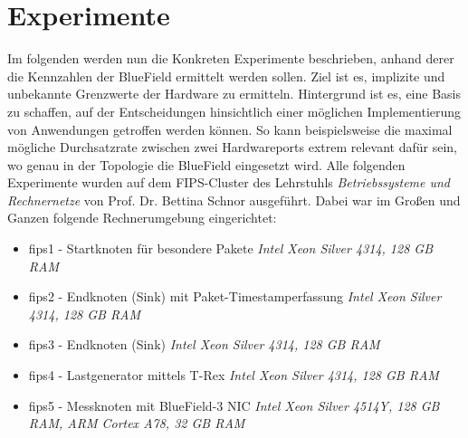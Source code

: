 \documentclass[paper=a4, fontsize=11pt]{scrartcl} %
\numberwithin{equation}{section} %
\numberwithin{figure}{section} %
\numberwithin{table}{section} %
\begin{document}
\section{Experimente}
Im folgenden werden nun die Konkreten Experimente beschrieben, anhand derer die Kennzahlen der BlueField ermittelt werden sollen. Ziel ist es, implizite und unbekannte Grenzwerte der Hardware zu ermitteln. Hintergrund ist es, eine Basis zu schaffen, auf der Entscheidungen hinsichtlich einer möglichen Implementierung von Anwendungen getroffen werden können. So kann beispielsweise die maximal mögliche Durchsatzrate zwischen zwei Hardwareports extrem relevant dafür sein, wo genau in der Topologie die BlueField eingesetzt wird. Alle folgenden Experimente wurden auf dem FIPS-Cluster des Lehrstuhls \textit{Betriebssysteme und Rechnernetze} von Prof. Dr. Bettina Schnor ausgeführt. Dabei war im Großen und Ganzen folgende Rechnerumgebung eingerichtet:
\begin{itemize}
    \item fips1 - Startknoten für besondere Pakete \textit{Intel Xeon Silver 4314, 128 GB RAM}
    \item fips2 - Endknoten (Sink) mit Paket-Timestamperfassung \textit{Intel Xeon Silver 4314, 128 GB RAM}
    \item fips3 - Endknoten (Sink) \textit{Intel Xeon Silver 4314, 128 GB RAM}
    \item fips4 - Lastgenerator mittels T-Rex \textit{Intel Xeon Silver 4314, 128 GB RAM}
    \item fips5 - Messknoten mit BlueField-3 NIC \textit{Intel Xeon Silver 4514Y, 128 GB RAM, ARM Cortex A78, 32 GB RAM}
\end{itemize}
\end{document}
